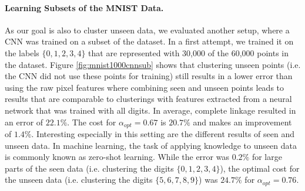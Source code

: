 \paragraph{Learning Subsets of the MNIST Data.} As our goal is also to cluster unseen data, we evaluated another setup, where a CNN was trained on a subset of the dataset. In a first attempt, we trained it on the labels $\{0,1,2,3,4\}$ that are represented with 30,000 of the 60,000 points in the dataset. Figure \ref{fig:mnist1000cnnsub} shows that clustering unseen points (i.e. the CNN did not use these points for training) still results in a lower error than using the raw pixel features where combining seen and unseen points leads to results that are comparable to clusterings with features extracted from a neural network that was trained with all digits. In average, complete linkage resulted in an error of $22.1\%$. The cost for $\alpha_{opt} = 0.67$ is $20.7\%$ and makes an improvement of $1.4\%$. Interesting especially in this setting are the different results of seen and unseen data. In machine learning, the task of applying knowledge to unseen data is commonly known as zero-shot learning. While the error was $0.2\%$ for large parts of the seen data (i.e. clustering the digits $\{0,1,2,3,4\}$), the optimal cost for the unseen data (i.e. clustering the digits $\{5,6,7,8,9\}$) was $24.7\%$ for $\alpha_{opt} = 0.76$. 

